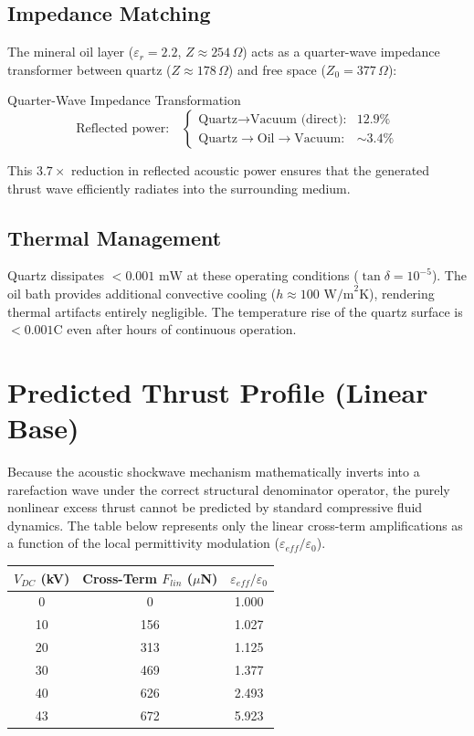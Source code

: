 \subsection{Impedance Matching}

The mineral oil layer ($\varepsilon_r = 2.2$, $Z \approx 254\,\Omega$) acts as a quarter-wave impedance transformer between quartz ($Z \approx 178\,\Omega$) and free space ($Z_0 = 377\,\Omega$):
\begin{resultbox}{Quarter-Wave Impedance Transformation}
\begin{equation}
    \text{Reflected power:} \quad
    \begin{cases}
        \text{Quartz} \to \text{Vacuum (direct):} & 12.9\% \\
        \text{Quartz} \to \text{Oil} \to \text{Vacuum:} & \sim 3.4\%
    \end{cases}
\end{equation}
\end{resultbox}

This $3.7\times$ reduction in reflected acoustic power ensures that the generated thrust wave efficiently radiates into the surrounding medium.

\subsection{Thermal Management}

Quartz dissipates $< 0.001\text{ mW}$ at these operating conditions ($\tan\delta = 10^{-5}$). The oil bath provides additional convective cooling ($h \approx 100\text{ W/m}^2\text{K}$), rendering thermal artifacts entirely negligible. The temperature rise of the quartz surface is $< 0.001$\textdegree C even after hours of continuous operation.

\section{Predicted Thrust Profile (Linear Base)}

Because the acoustic shockwave mechanism mathematically inverts into a rarefaction wave under the correct structural denominator operator, the purely nonlinear excess thrust cannot be predicted by standard compressive fluid dynamics. The table below represents only the linear cross-term amplifications as a function of the local permittivity modulation ($\varepsilon_{eff}/\varepsilon_0$).

\begin{center}
\begin{tabular}{|c|c|c|}
\hline
$V_{DC}$ (kV) & Cross-Term $F_{lin}$ ($\mu$N) & $\varepsilon_{eff}/\varepsilon_0$ \\ \hline
0   & 0    & 1.000 \\
10  & 156  & 1.027 \\
20  & 313  & 1.125 \\
30  & 469  & 1.377 \\
40  & 626  & 2.493 \\
43  & 672  & 5.923 \\ \hline
\end{tabular}
\end{center}

